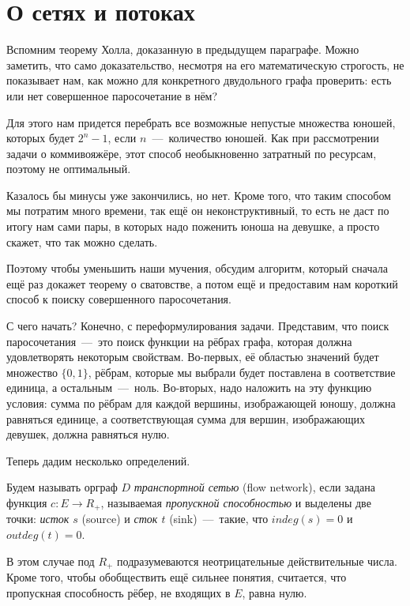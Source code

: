 \section{О сетях и потоках}

	Вспомним теорему Холла, доказанную в предыдущем параграфе. Можно заметить, что само доказательство, несмотря на его математическую строгость, не показывает нам, как можно для конкретного двудольного графа проверить: есть или нет совершенное паросочетание в нём? 
	
	Для этого нам придется перебрать все возможные непустые множества юношей, которых будет $2^n - 1$, если $n$~---~количество юношей. Как при рассмотрении задачи о коммивояжёре, этот способ необыкновенно затратный по ресурсам, поэтому не оптимальный. 
	
	Казалось бы минусы уже закончились, но нет. Кроме того, что таким способом мы потратим много времени, так ещё он неконструктивный, то есть не даст по итогу нам сами пары, в которых надо поженить юноша на девушке, а просто скажет, что так можно сделать.
	
	Поэтому чтобы уменьшить наши мучения, обсудим алгоритм, который сначала ещё раз докажет теорему о сватовстве, а потом ещё и предоставим нам короткий способ к поиску совершенного паросочетания.

	С чего начать? Конечно, с переформулирования задачи. Представим, что поиск паросочетания~---~это поиск функции на рёбрах графа, которая должна удовлетворять некоторым свойствам. Во-первых, её областью значений будет множество $\lbrace 0, 1\rbrace$, рёбрам, которые мы выбрали будет поставлена в соответствие единица, а остальным~---~ноль. Во-вторых, надо наложить на эту функцию условия: сумма по рёбрам для каждой вершины, изображающей юношу, должна равняться единице, а соответствующая сумма для вершин, изображающих девушек, должна равняться нулю. 
	
	Теперь дадим несколько определений.
	
\newpage
{}	
	
\begin{definition}
	Будем называть орграф $D$ \emph{транспортной сетью} (flow network), если задана функция $c\colon E \to R_{+}$, называемая \emph{пропускной способностью} и выделены две точки: \emph{исток $s$} (source) и \emph{сток $t$} (sink)~---~такие, что $indeg(s) = 0$ и $outdeg(t) = 0$.
\end{definition}

	В этом случае под $R_{+}$ подразумеваются неотрицательные действительные числа. Кроме того, чтобы обобществить ещё сильнее понятия, считается, что пропускная способность рёбер, не входящих в $E$, равна нулю.

